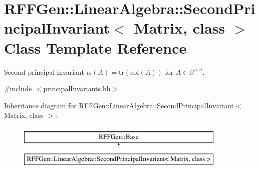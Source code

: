 \hypertarget{classRFFGen_1_1LinearAlgebra_1_1SecondPrincipalInvariant}{\section{R\-F\-F\-Gen\-:\-:Linear\-Algebra\-:\-:Second\-Principal\-Invariant$<$ Matrix, class $>$ Class Template Reference}
\label{classRFFGen_1_1LinearAlgebra_1_1SecondPrincipalInvariant}
}


Second principal invariant $ \iota_2(A)=\mathrm{tr}(\mathrm{cof}(A)) $ for $A\in\mathbb{R}^{n,n}$.  




{\ttfamily \#include $<$principal\-Invariants.\-hh$>$}

Inheritance diagram for R\-F\-F\-Gen\-:\-:Linear\-Algebra\-:\-:Second\-Principal\-Invariant$<$ Matrix, class $>$\-:\begin{figure}[H]
\begin{center}
\leavevmode
\includegraphics[height=2.000000cm]{classRFFGen_1_1LinearAlgebra_1_1SecondPrincipalInvariant}
\end{center}
\end{figure}

